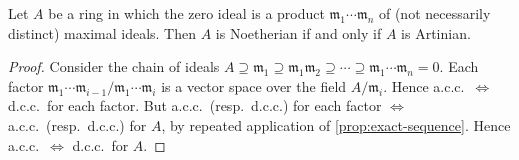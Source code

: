 \begin{corollary}\label{cor:artinian-noetherian}
Let $A$ be a ring in which the zero ideal is a product $\mathfrak{m}_1 \cdots \mathfrak{m}_n$ of (not necessarily distinct) maximal ideals. Then $A$ is Noetherian if and only if $A$ is Artinian.
\end{corollary}

\begin{proof}
Consider the chain of ideals $A \supseteq \mathfrak{m}_1 \supseteq \mathfrak{m}_1\mathfrak{m}_2 \supseteq \cdots \supseteq \mathfrak{m}_1 \cdots \mathfrak{m}_n = 0$. Each factor $\mathfrak{m}_1 \cdots \mathfrak{m}_{i-1}/\mathfrak{m}_1 \cdots \mathfrak{m}_i$ is a vector space over the field $A/\mathfrak{m}_i$. Hence a.c.c.\ $\iff$ d.c.c.\ for each factor. But a.c.c.\ (resp.\ d.c.c.) for each factor $\iff$ a.c.c.\ (resp.\ d.c.c.) for $A$, by repeated application of \eqref{prop:exact-sequence}. Hence a.c.c.\ $\iff$ d.c.c.\ for $A$.
\end{proof}


